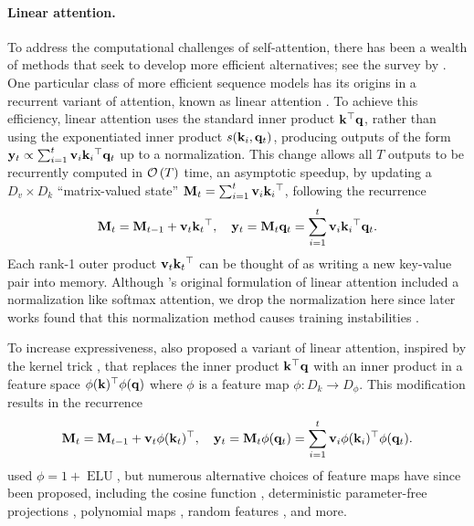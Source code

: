 \documentclass[notitlepage, 11pt]{article}
\newcommand*{\dkey}{{D_k}}
\newcommand*{\dphi}{{D_\phi}}
\newcommand*{\dval}{{D_v}}
\begin{document}
\paragraph{Linear attention.}
To address the computational challenges of self-attention, there has been a wealth of methods that seek to develop more efficient alternatives; see the survey by \citet{Tay2022EfficientTransformersSurvey}.
One particular class of more efficient sequence models has its origins in a recurrent variant of attention, known as linear attention \citep{Katharopoulos2020TransformersAreRNNs}.
To achieve this efficiency, linear attention uses the standard inner product $\mathbf{k}{}^\top \mathbf{q}$, rather than using the exponentiated inner product $s(\mathbf{k}_i, \mathbf{q}_t)$, producing outputs of the form $\mathbf{y}_t \propto \sum_{i=1}^t \mathbf{v}_i\mathbf{k}_i{}^\top\mathbf{q}_t$ up to a normalization.
This change allows all $T$ outputs to be recurrently computed in $\mathcal{O}\left( T \right)$ time, an asymptotic speedup, by updating a $\dval\times \dkey$ ``matrix-valued state'' $\mathbf{M}_t = \sum_{i=1}^t\mathbf{v}_i\mathbf{k}_i{}^\top$, following the recurrence
\begin{align}
    \mathbf{M}_t = \mathbf{M}_{t-1} + \mathbf{v}_t\mathbf{k}_t{}^\top, \quad \mathbf{y}_t = \mathbf{M}_t \mathbf{q}_t = \sum_{i=1}^t \mathbf{v}_i\mathbf{k}_i{}^\top\mathbf{q}_t. \label{eqn:linear-attention-recurrence}
\end{align}
Each rank-1 outer product $\mathbf{v}_t\mathbf{k}_t{}^\top$ can be thought of as writing a new key-value pair into memory.
Although \citet{Katharopoulos2020TransformersAreRNNs}'s original formulation of linear attention included a normalization like softmax attention, we drop the normalization here since later works found that this normalization method causes training instabilities \citep{Qin2022DevilLinearTransformer,Dao2024TransformersAreSSMs} .

To increase expressiveness, \citet{Katharopoulos2020TransformersAreRNNs} also proposed a variant of linear attention, inspired by the kernel trick \citep{Scholkopf2001LearningKernelsSupport}, that replaces the inner product $\mathbf{k}{}^\top\mathbf{q}$ with an inner product in a feature space $\phi(\mathbf{k}){}^\top\phi(\mathbf{q})$ where $\phi$ is a feature map $\phi:\dkey\to\dphi$.
This modification results in the recurrence
\begin{align}
    \mathbf{M}_t = \mathbf{M}_{t-1} + \mathbf{v}_t\phi(\mathbf{k}_t){}^\top, \quad \mathbf{y}_t = \mathbf{M}_t \phi(\mathbf{q}_t) = \sum_{i=1}^t \mathbf{v}_i\phi(\mathbf{k}_i){}^\top\phi(\mathbf{q}_t).
\end{align}
\citet{Katharopoulos2020TransformersAreRNNs} used $\phi = 1 + \operatorname{ELU}$, but numerous alternative choices of feature maps have since been proposed, including the cosine function \citep{Qin2021CosFormerRethinkingSoftmax}, deterministic parameter-free projections \citep{Schlag2021LinearTransformersAre}, polynomial maps \citep{Zhang2023HedgehogPorcupineExpressive,Aksenov2024LinearTransformersLearnable,Arora2024SimpleLinearAttention}, random features \citep{Peng2020RandomFeatureAttention,Choromanski2020RethinkingAttentionPerformers,Chen2024DiJiangEfficientLarge}, and more.
\end{document}
